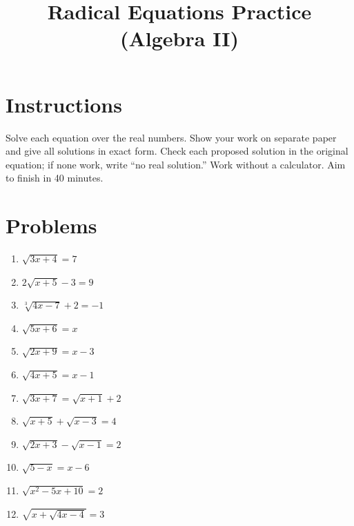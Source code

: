 \documentclass[12pt]{article}
\title{Radical Equations Practice (Algebra II)}
\author{}
\date{}
\begin{document}
\maketitle

\section*{Instructions}
Solve each equation over the real numbers. Show your work on separate paper
and give all solutions in exact form. Check each proposed solution in the
original equation; if none work, write ``no real solution.'' Work without a
calculator. Aim to finish in 40 minutes.

\section*{Problems}
\begin{enumerate}[leftmargin=*, itemsep=1.1em, topsep=0.8em]
  \item $\sqrt{3x+4}=7$
  \item $2\sqrt{x+5}-3=9$
  \item $\sqrt[3]{4x-7}+2=-1$
  \item $\sqrt{5x+6}=x$
  \item $\sqrt{2x+9}=x-3$
  \item $\sqrt{4x+5}=x-1$
  \item $\sqrt{3x+7}=\sqrt{x+1}+2$
  \item $\sqrt{x+5}+\sqrt{x-3}=4$
  \item $\sqrt{2x+3}-\sqrt{x-1}=2$
  \item $\sqrt{5-x}=x-6$
  \item $\sqrt{x^2-5x+10}=2$
  \item $\sqrt{x+\sqrt{4x-4}}=3$
\end{enumerate}
\end{document}
